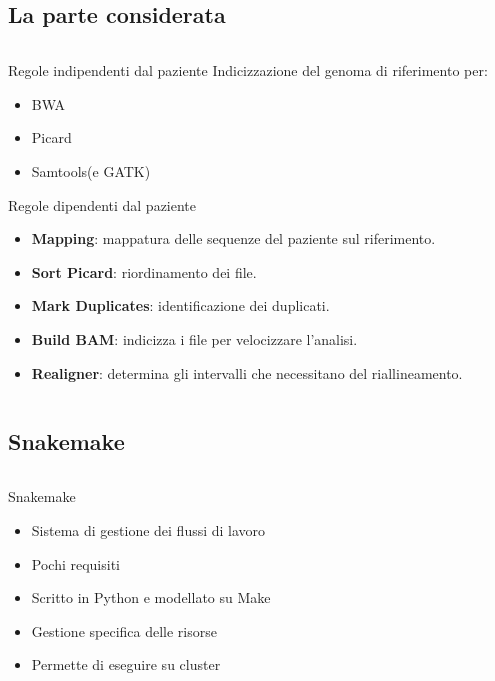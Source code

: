 \documentclass{beamer}
\begin{document}
\subsection{La parte considerata}
\begin{frame}
\begin{columns}
\begin{column}{0.8\linewidth}
\begin{block}{Regole indipendenti dal paziente}
Indicizzazione del genoma di riferimento per:
\begin{itemize}
\item BWA
\item Picard
\item Samtools(e GATK) 
\end{itemize}
\end{block}
\begin{block}{Regole dipendenti dal paziente}
\begin{itemize}
\item \textbf{Mapping}: mappatura delle sequenze del paziente sul riferimento.
\item \textbf{Sort Picard}: riordinamento dei file. 
\item \textbf{Mark Duplicates}: identificazione dei duplicati.
\item \textbf{Build BAM}: indicizza i file per velocizzare l'analisi.
\item \textbf{Realigner}: determina gli intervalli che necessitano del riallineamento.
\end{itemize}
\end{block}
\end{column}
\end{columns}
\end{frame}

\subsection{Snakemake}
\begin{frame}
\begin{columns}
\begin{column}{0.8\linewidth}
\begin{block}{Snakemake}
\begin{itemize}
\item Sistema di gestione dei flussi di lavoro
\item Pochi requisiti 
\item Scritto in Python e modellato su Make
\item Gestione specifica delle risorse
\item Permette di eseguire su cluster
\end{itemize}
\end{block}
\end{column}
\end{columns}
\end{frame}
\end{document}

